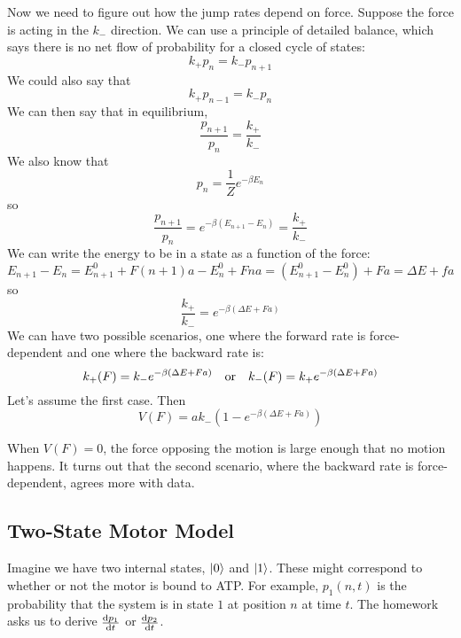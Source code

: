 \documentclass[a4paper,twoside,master.tex]{subfiles}
\begin{document}
Now we need to figure out how the jump rates depend on force. Suppose the force is acting in the $ k_- $ direction. We can use a principle of detailed balance, which says there is no net flow of probability for a closed cycle of states:
\begin{equation}
    k_+ p_n = k_- p_{n+1}
\end{equation}
We could also say that
\begin{equation}
    k_+ p_{n-1} = k_- p_n
\end{equation}
We can then say that in equilibrium,
\begin{equation}
    \frac{p_{n+1}}{p_n} = \frac{k_+}{k_-}
\end{equation}
We also know that
\begin{equation}
    p_n = \frac{1}{Z} e^{- \beta E_n}
\end{equation}
so
\begin{equation}
    \frac{p_{n+1}}{p_n} = e^{- \beta (E_{n+1} - E_n)} = \frac{k_+}{k_-}
\end{equation}
We can write the energy to be in a state as a function of the force:
\begin{equation}
    E_{n+1} - E_n = E_{n+1}^0 + F(n+1) a - E_n^0 + F n a = (E_{n+1}^0 - E_n^0) + Fa = \Delta E + fa
\end{equation}
so
\begin{equation}
    \frac{k_+}{k_-} = e^{- \beta (\Delta E + Fa)}
\end{equation}
We can have two possible scenarios, one where the forward rate is force-dependent and one where the backward rate is:
\begin{equation}
    k_+(F) = k_- e^{- \beta (\Delta E + Fa)} \qor k_-(F) = k_+ e^{- \beta (\Delta E + Fa)} 
\end{equation}
Let's assume the first case. Then
\begin{equation}
    V(F) = a k_- \left( 1 - e^{- \beta (\Delta E + Fa)} \right)
\end{equation}

When $ V(F) = 0 $, the force opposing the motion is large enough that no motion happens. It turns out that the second scenario, where the backward rate is force-dependent, agrees more with data.

\subsection{Two-State Motor Model}\label{sub:two-state_motor_model}

Imagine we have two internal states, $\ket{0} $ and $\ket{1} $. These might correspond to whether or not the motor is bound to ATP. For example, $ p_1(n,t) $ is the probability that the system is in state $ 1 $ at position $ n $ at time $ t $. The homework asks us to derive $ \dv{p_1}{t} $ or $ \dv{p_2}{t} $.
\end{document}
